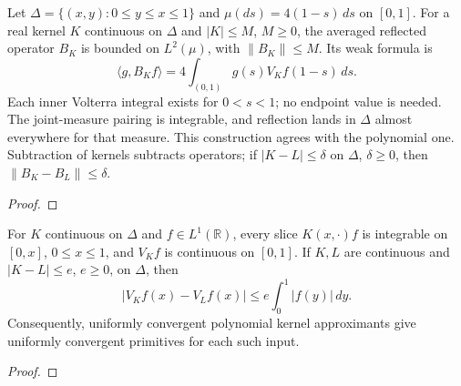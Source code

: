 \begin{supporting}
\begin{theorem}
\label{thm:continuous-jacobi-volterra}
\leanok
Let $\Delta=\{(x,y):0\le y\le x\le1\}$ and $\mu(ds)=4(1-s)\,ds$ on $[0,1]$.
For a real kernel $K$ continuous on $\Delta$ and $|K|\le M$, $M\ge0$,
the averaged reflected operator $B_K$ is bounded on $L^2(\mu)$, with
$\|B_K\|\le M$. Its weak formula is
\[
 \langle g,B_Kf\rangle=4\int_{(0,1)}g(s)V_Kf(1-s)\,ds.
\]
Each inner Volterra integral exists for $0<s<1$; no endpoint value is needed.
The joint-measure pairing is integrable, and reflection lands in $\Delta$
almost everywhere for that measure. This construction agrees with the polynomial
one. Subtraction of kernels subtracts operators; if $|K-L|\le\delta$ on
$\Delta$, $\delta\ge0$, then $\|B_K-B_L\|\le\delta$.
\end{theorem}
\begin{proof}
\leanok
\end{proof}

\begin{theorem}
\label{thm:continuous-volterra-primitives}
\leanok
For $K$ continuous on $\Delta$ and $f\in L^1(\mathbb R)$, every slice
$K(x,\cdot)f$ is integrable on $[0,x]$, $0\le x\le1$, and $V_Kf$ is continuous
on $[0,1]$. If $K,L$ are continuous and $|K-L|\le e$, $e\ge0$, on $\Delta$, then
\[
 |V_Kf(x)-V_Lf(x)|\le e\int_0^1|f(y)|\,dy.
\]
Consequently, uniformly convergent polynomial kernel approximants give uniformly
convergent primitives for each such input.
\end{theorem}
\begin{proof}
\leanok
\end{proof}
\end{supporting}


